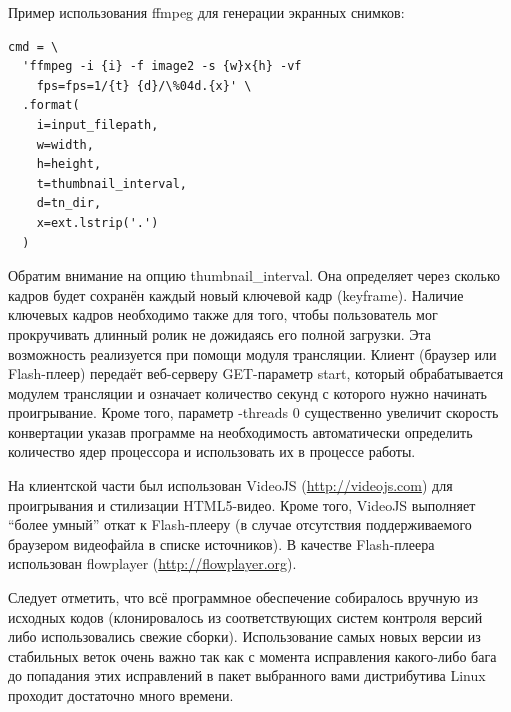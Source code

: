\FloatBarrier

Пример использования ffmpeg для генерации экранных снимков:
\begin{verbatim}
cmd = \
  'ffmpeg -i {i} -f image2 -s {w}x{h} -vf
    fps=fps=1/{t} {d}/\%04d.{x}' \
  .format(
    i=input_filepath,
    w=width,
    h=height,
    t=thumbnail_interval,
    d=tn_dir,
    x=ext.lstrip('.')
  )
\end{verbatim}

Обратим внимание на опцию thumbnail\_interval. Она определяет через сколько кадров будет сохранён каждый новый
ключевой кадр (keyframe). Наличие ключевых кадров необходимо также для того, чтобы пользователь мог прокручивать
длинный ролик не дожидаясь его полной загрузки. Эта возможность реализуется при помощи модуля трансляции.
Клиент (браузер или Flash-плеер) передаёт веб-серверу GET-параметр start, который обрабатывается модулем трансляции
и означает количество секунд с которого нужно начинать проигрывание. Кроме того, параметр -threads 0 существенно
увеличит скорость конвертации указав программе на необходимость автоматически определить количество ядер
процессора и использовать их в процессе работы.

На клиентской части был использован VideoJS (\url{http://videojs.com}) для проигрывания и стилизации HTML5-видео.
Кроме того, VideoJS выполняет “более умный” откат к Flash-плееру (в случае отсутствия поддерживаемого браузером видеофайла
в списке источников). В качестве Flash-плеера использован flowplayer (\url{http://flowplayer.org}).

Следует отметить, что всё программное обеспечение собиралось вручную из исходных кодов (клонировалось из соответствующих
систем контроля версий либо использовались свежие сборки). Использование самых новых версии из стабильных веток очень важно
так как с момента исправления какого-либо бага до попадания этих исправлений в пакет выбранного вами дистрибутива Linux
проходит достаточно много времени.


